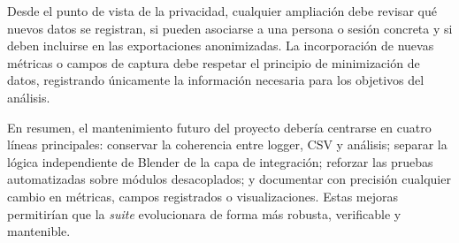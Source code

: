 Desde el punto de vista de la privacidad, cualquier ampliación debe revisar qué nuevos datos se registran, si pueden asociarse a una persona o sesión concreta y si deben incluirse en las exportaciones anonimizadas. La incorporación de nuevas métricas o campos de captura debe respetar el principio de minimización de datos, registrando únicamente la información necesaria para los objetivos del análisis.

En resumen, el mantenimiento futuro del proyecto debería centrarse en cuatro líneas principales: conservar la coherencia entre logger, CSV y análisis; separar la lógica independiente de Blender de la capa de integración; reforzar las pruebas automatizadas sobre módulos desacoplados; y documentar con precisión cualquier cambio en métricas, campos registrados o visualizaciones. Estas mejoras permitirían que la \textit{suite} evolucionara de forma más robusta, verificable y mantenible.